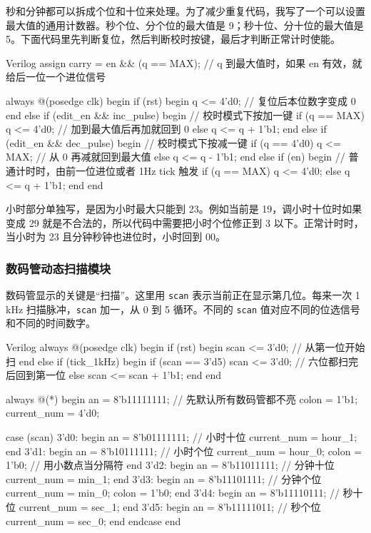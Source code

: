 \documentclass[12pt,a4paper,UTF8]{ctexart}
\begin{document}
秒和分钟都可以拆成个位和十位来处理。为了减少重复代码，我写了一个可以设置最大值的通用计数器。秒个位、分个位的最大值是 9；秒十位、分十位的最大值是 5。下面代码里先判断复位，然后判断校时按键，最后才判断正常计时使能。

\begin{codeblock}{Verilog}
assign carry = en && (q == MAX);
// q 到最大值时，如果 en 有效，就给后一位一个进位信号

always @(posedge clk) begin
    if (rst) begin
        q <= 4'd0; // 复位后本位数字变成 0
    end else if (edit_en && inc_pulse) begin
        // 校时模式下按加一键
        if (q == MAX)
            q <= 4'd0; // 加到最大值后再加就回到 0
        else
            q <= q + 1'b1;
    end else if (edit_en && dec_pulse) begin
        // 校时模式下按减一键
        if (q == 4'd0)
            q <= MAX; // 从 0 再减就回到最大值
        else
            q <= q - 1'b1;
    end else if (en) begin
        // 普通计时时，由前一位进位或者 1Hz tick 触发
        if (q == MAX)
            q <= 4'd0;
        else
            q <= q + 1'b1;
    end
end
\end{codeblock}

小时部分单独写，是因为小时最大只能到 23。例如当前是 19，调小时十位时如果变成 29 就是不合法的，所以代码中需要把小时个位修正到 3 以下。正常计时时，当小时为 23 且分钟秒钟也进位时，小时回到 00。

\subsubsection{数码管动态扫描模块}

数码管显示的关键是“扫描”。这里用 \texttt{scan} 表示当前正在显示第几位。每来一次 1 kHz 扫描脉冲，\texttt{scan} 加一，从 0 到 5 循环。不同的 \texttt{scan} 值对应不同的位选信号和不同的时间数字。

\begin{codeblock}{Verilog}
always @(posedge clk) begin
    if (rst) begin
        scan <= 3'd0; // 从第一位开始扫
    end else if (tick_1kHz) begin
        if (scan == 3'd5)
            scan <= 3'd0; // 六位都扫完后回到第一位
        else
            scan <= scan + 1'b1;
    end
end

always @(*) begin
    an = 8'b11111111; // 先默认所有数码管都不亮
    colon = 1'b1;
    current_num = 4'd0;

    case (scan)
        3'd0: begin
            an = 8'b01111111; // 小时十位
            current_num = hour_1;
        end
        3'd1: begin
            an = 8'b10111111; // 小时个位
            current_num = hour_0;
            colon = 1'b0;     // 用小数点当分隔符
        end
        3'd2: begin
            an = 8'b11011111; // 分钟十位
            current_num = min_1;
        end
        3'd3: begin
            an = 8'b11101111; // 分钟个位
            current_num = min_0;
            colon = 1'b0;
        end
        3'd4: begin
            an = 8'b11110111; // 秒十位
            current_num = sec_1;
        end
        3'd5: begin
            an = 8'b11111011; // 秒个位
            current_num = sec_0;
        end
    endcase
end
\end{codeblock}
\end{document}
